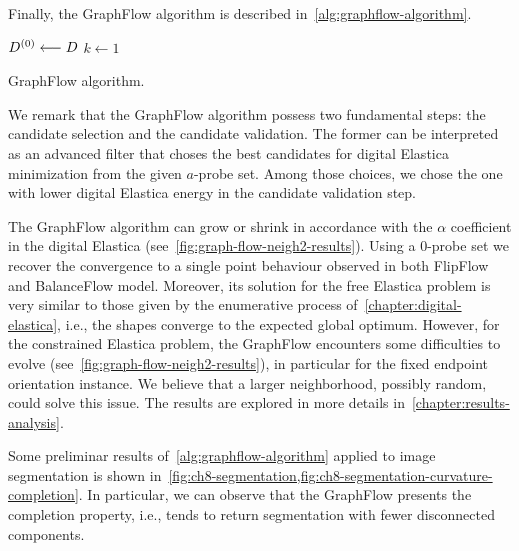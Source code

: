 Finally, the GraphFlow algorithm is described in~\cref{alg:graphflow-algorithm}.


\begin{algorithm}
 
 \BlankLine
 $D^{(0)} \longleftarrow D$\;
 $k \longleftarrow 1$\;
 \caption{GraphFlow algorithm.}
 \label{alg:graphflow-algorithm}  
\end{algorithm}

We remark that the GraphFlow algorithm possess two fundamental steps: the candidate selection and the candidate validation. The former can be interpreted as an advanced filter that choses the best candidates for digital Elastica minimization from the given $a$-probe set. Among those choices, we chose the one with lower digital Elastica energy in the candidate validation step.

The GraphFlow algorithm can grow or shrink in accordance with the $\alpha$ coefficient in the digital Elastica (see~\cref{fig:graph-flow-neigh2-results}). Using a $0$-probe set we recover the convergence to a single point behaviour observed in both FlipFlow and BalanceFlow model. Moreover, its solution for the free Elastica problem is very similar to those given by the enumerative process of~\cref{chapter:digital-elastica}, i.e., the shapes converge to the expected global optimum. However, for the constrained Elastica problem, the GraphFlow encounters some difficulties to evolve (see~\cref{fig:graph-flow-neigh2-results}), in particular for the fixed endpoint orientation instance. We believe that a larger neighborhood, possibly random, could solve this issue. The results are explored in more details in~\cref{chapter:results-analysis}.

Some preliminar results of~\cref{alg:graphflow-algorithm} applied to image segmentation is shown in~\cref{fig:ch8-segmentation,fig:ch8-segmentation-curvature-completion}. In particular, we can observe that the GraphFlow presents the completion property, i.e., tends to return segmentation with fewer disconnected components.


